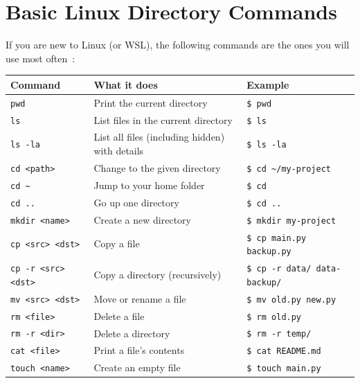\documentclass[11pt]{article}
\begin{document}

\appendix
\section{Basic Linux Directory Commands}
\label{app:linux-commands}

If you are new to Linux (or WSL), the following commands are the ones you will use most often~\cite{microsoft_wsl2026}:

\begin{center}
\begin{tabular}{lll}
\toprule
\textbf{Command} & \textbf{What it does} & \textbf{Example} \\
\midrule
\texttt{pwd}        & Print the current directory & \texttt{\$ pwd} \\
\texttt{ls}         & List files in the current directory & \texttt{\$ ls} \\
\texttt{ls -la}     & List all files (including hidden) with details & \texttt{\$ ls -la} \\
\texttt{cd \textless{}path\textgreater{}} & Change to the given directory & \texttt{\$ cd \textasciitilde/my-project} \\
\texttt{cd \textasciitilde{}} & Jump to your home folder & \texttt{\$ cd} \\
\texttt{cd ..}            & Go up one directory & \texttt{\$ cd ..} \\
\texttt{mkdir \textless{}name\textgreater{}} & Create a new directory & \texttt{\$ mkdir my-project} \\
\texttt{cp \textless{}src\textgreater{} \textless{}dst\textgreater{}} & Copy a file & \texttt{\$ cp main.py backup.py} \\
\texttt{cp -r \textless{}src\textgreater{} \textless{}dst\textgreater{}} & Copy a directory (recursively) & \texttt{\$ cp -r data/ data-backup/} \\
\texttt{mv \textless{}src\textgreater{} \textless{}dst\textgreater{}} & Move or rename a file & \texttt{\$ mv old.py new.py} \\
\texttt{rm \textless{}file\textgreater{}} & Delete a file & \texttt{\$ rm old.py} \\
\texttt{rm -r \textless{}dir\textgreater{}} & Delete a directory & \texttt{\$ rm -r temp/} \\
\texttt{cat \textless{}file\textgreater{}} & Print a file's contents & \texttt{\$ cat README.md} \\
\texttt{touch \textless{}name\textgreater{}} & Create an empty file & \texttt{\$ touch main.py} \\
\bottomrule
\end{tabular}
\end{center}
\end{document}
